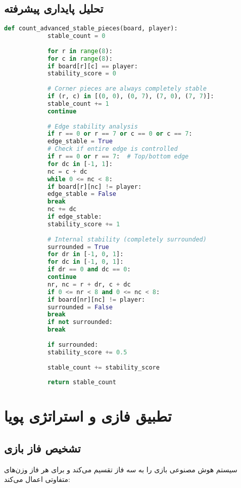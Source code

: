 \documentclass[12pt]{article}
\newenvironment{ltrcode}{\lr\bgroup}{\egroup}
\begin{document}
	\subsection{تحلیل پایداری پیشرفته}
	
	\begin{ltrcode}
		\begin{lstlisting}[language=Python, caption=Advanced Stability Analysis]
			def count_advanced_stable_pieces(board, player):
			stable_count = 0
			
			for r in range(8):
			for c in range(8):
			if board[r][c] == player:
			stability_score = 0
			
			# Corner pieces are always completely stable
			if (r, c) in [(0, 0), (0, 7), (7, 0), (7, 7)]:
			stable_count += 1
			continue
			
			# Edge stability analysis
			if r == 0 or r == 7 or c == 0 or c == 7:
			edge_stable = True
			# Check if entire edge is controlled
			if r == 0 or r == 7:  # Top/bottom edge
			for dc in [-1, 1]:
			nc = c + dc
			while 0 <= nc < 8:
			if board[r][nc] != player:
			edge_stable = False
			break
			nc += dc
			if edge_stable:
			stability_score += 1
			
			# Internal stability (completely surrounded)
			surrounded = True
			for dr in [-1, 0, 1]:
			for dc in [-1, 0, 1]:
			if dr == 0 and dc == 0:
			continue
			nr, nc = r + dr, c + dc
			if 0 <= nr < 8 and 0 <= nc < 8:
			if board[nr][nc] != player:
			surrounded = False
			break
			if not surrounded:
			break
			
			if surrounded:
			stability_score += 0.5
			
			stable_count += stability_score
			
			return stable_count
		\end{lstlisting}
	\end{ltrcode}
	
	\section{تطبیق فازی و استراتژی پویا}
	
	\subsection{تشخیص فاز بازی}
	
	سیستم هوش مصنوعی بازی را به سه فاز تقسیم می‌کند و برای هر فاز وزن‌های متفاوتی اعمال می‌کند:
	
\end{document}
